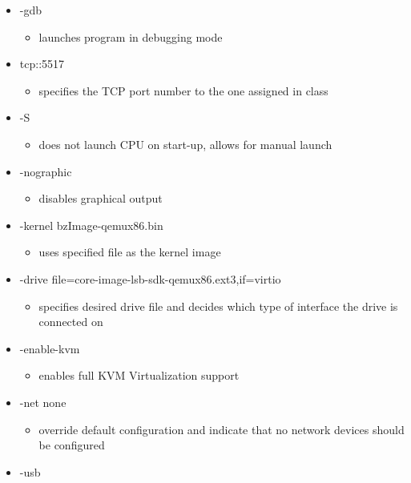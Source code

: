 \documentclass[letterpaper,10pt,onecolumn]{IEEEtran}
\begin{document}
    \begin{itemize}
        \item -gdb
        \begin{itemize}
            \item launches program in debugging mode
        \end{itemize}
        \item tcp::5517
        \begin{itemize}
            \item specifies the TCP port number to the one assigned in class
        \end{itemize}
        \item -S
        \begin{itemize}
            \item does not launch CPU on start-up, allows for manual launch
        \end{itemize}
        \item -nographic
        \begin{itemize}
            \item disables graphical output
        \end{itemize}
        \item -kernel bzImage-qemux86.bin
        \begin{itemize}
            \item uses specified file as the kernel image
        \end{itemize}
        \item -drive file=core-image-lsb-sdk-qemux86.ext3,if=virtio
        \begin{itemize}
            \item specifies desired drive file and decides which type of interface the drive is connected on
        \end{itemize}
        \item -enable-kvm
        \begin{itemize}
            \item enables full KVM Virtualization support
        \end{itemize}
        \item -net none
        \begin{itemize}
            \item override default configuration and indicate that no network devices should be configured
        \end{itemize}
        \item -usb
        \begin{itemize}

\end{itemize}
\end{itemize}
\end{document}

